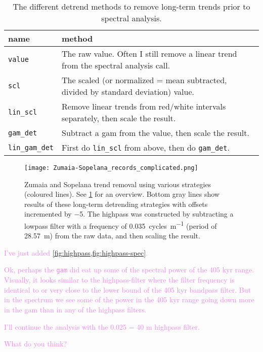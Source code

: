 \documentclass[draft]{agujournal2019}
\newcommand{\ijk}{\textcolor{violet}}
\begin{document}
\begin{table}[htbp]
  \caption{\label{tab:detrend_types}The different detrend methods to remove
    long-term trends prior to spectral analysis.}
\centering
\begin{tabular}{ll}
  name & method\\
  \hline
  \texttt{value} & The raw value. Often I still remove a linear trend from the spectral analysis call.\\
  \texttt{scl} & The scaled (or normalized = mean subtracted, divided by standard deviation) value.\\
  \texttt{lin\_scl} & Remove linear trends from red/white intervals separately, then scale the result.\\
  \texttt{gam\_det} & Subtract a gam from the value, then scale the result.\\
  \texttt{lin\_gam\_det} & First do \texttt{lin\_scl} from above, then do \texttt{gam\_det}.\\
\end{tabular}
\end{table}

\begin{figure}[htbp]
  \centering
  \texttt{[image: Zumaia-Sopelana\_records\_complicated.png]}
  \caption{\label{fig:detrend}Zumaia and Sopelana trend removal using various
    strategies (coloured lines). See \cref{tab:detrend_types} for an overview.
    Bottom gray lines show results of these long-term detrending strategies
    with offsets incremented by \num{-5}. The highpass was constructed by
    subtracting a lowpass filter with a frequency of
    \qty{0.035}{cycles\per\metre} (period of \qty{28.57}{\metre}) from the raw
    data, and then scaling the result.}
\end{figure}

\ijk{

  I've just added \cref{fig:highpass,fig:highpass-spec}.

  Ok, perhaps the \texttt{gam} did eat up some of the spectral power of the 405
  kyr range. Visually, it looks similar to the highpass-filter where the filter
  frequency is identical to or very close to the lower bound of the 405 kyr
  bandpass filter. But in the spectrum we see some of the power in the 405 kyr
  range going down more in the gam than in any of the highpass filters.

  I'll continue the analysis with the 0.025 = 40 m highpass filter.

  What do you think?

}
\end{document}
